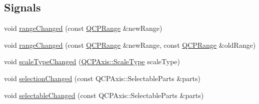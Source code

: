 \subsection*{Signals}
\begin{DoxyCompactItemize}
\item 
void \hyperlink{class_q_c_p_axis_a0894084e4c16a1736534c4095746f910}{range\+Changed} (const \hyperlink{class_q_c_p_range}{Q\+C\+P\+Range} \&new\+Range)
\item 
void \hyperlink{class_q_c_p_axis_aac8576288e8e31f16186124bc10dd10d}{range\+Changed} (const \hyperlink{class_q_c_p_range}{Q\+C\+P\+Range} \&new\+Range, const \hyperlink{class_q_c_p_range}{Q\+C\+P\+Range} \&old\+Range)
\item 
void \hyperlink{class_q_c_p_axis_a3505ed8a93bd2e349d858d84996bf767}{scale\+Type\+Changed} (\hyperlink{class_q_c_p_axis_a36d8e8658dbaa179bf2aeb973db2d6f0}{Q\+C\+P\+Axis\+::\+Scale\+Type} scale\+Type)
\item 
void \hyperlink{class_q_c_p_axis_a62b598abeee7174a05f9d542cc85b1f5}{selection\+Changed} (const Q\+C\+P\+Axis\+::\+Selectable\+Parts \&parts)
\item 
void \hyperlink{class_q_c_p_axis_aa5ff1fd851139028a3bb4efcb31de9fc}{selectable\+Changed} (const Q\+C\+P\+Axis\+::\+Selectable\+Parts \&parts)
\end{DoxyCompactItemize}
